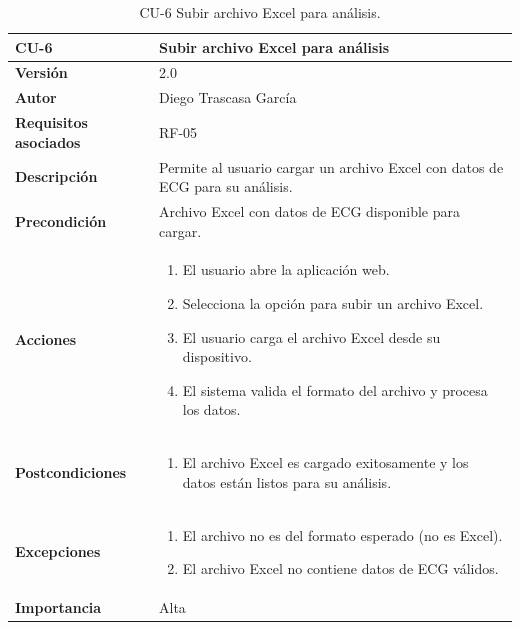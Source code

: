 \begin{table}[p]
	\centering
	\begin{tabularx}{\linewidth}{ p{} p{} }
		\toprule
		\textbf{CU-6}    & \textbf{Subir archivo Excel para análisis}\\
		\toprule
		\textbf{Versión}              & 2.0    \\
		\textbf{Autor}                & Diego Trascasa García \\
		\textbf{Requisitos asociados} & RF-05 \\
		\textbf{Descripción}          & Permite al usuario cargar un archivo Excel con datos de ECG para su análisis. \\
		\textbf{Precondición}         & Archivo Excel con datos de ECG disponible para cargar. \\
		\textbf{Acciones}             &
		\begin{enumerate}
			\item El usuario abre la aplicación web.
			\item Selecciona la opción para subir un archivo Excel.
			\item El usuario carga el archivo Excel desde su dispositivo.
			\item El sistema valida el formato del archivo y procesa los datos.
		\end{enumerate}\\
		\textbf{Postcondiciones}      & 
		\begin{enumerate}
			\item El archivo Excel es cargado exitosamente y los datos están listos para su análisis.
		\end{enumerate}\\
		\textbf{Excepciones}          & 
		\begin{enumerate}
			\item El archivo no es del formato esperado (no es Excel).
			\item El archivo Excel no contiene datos de ECG válidos.
		\end{enumerate}\\
		\textbf{Importancia}          & Alta \\
		\bottomrule
	\end{tabularx}
	\caption{CU-6 Subir archivo Excel para análisis.}
    \label{CU-6}
\end{table}


